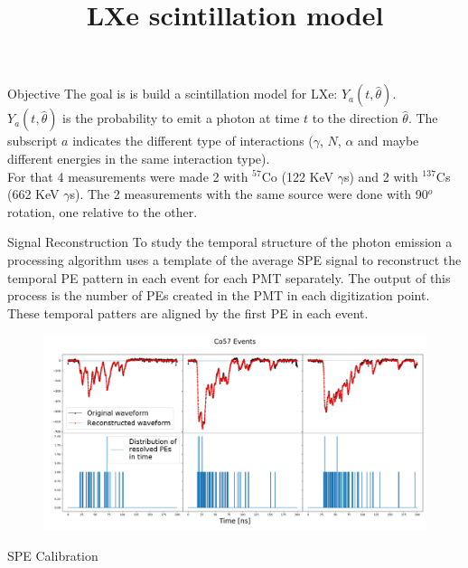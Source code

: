 \documentclass{beamer}
\title{LXe scintillation model}
\begin{document}
{ 
\frame{\titlepage}}

\begin{frame}{Objective}
The goal is is build a scintillation model for LXe: $Y_{a}(t,\hat{\theta})$.\\
$Y_{a}(t,\hat{\theta})$ is the probability to emit a photon at time $t$ to the direction $\hat{\theta}$. The subscript $a$ indicates the different type of interactions ($\gamma$, $N$, $\alpha$ and maybe different energies in the same interaction type).\\

For that 4 measurements were made 2 with $^{57}$Co (122 KeV $\gamma$s) and 2 with $^{137}$Cs (662 KeV $\gamma$s). The 2 measurements with the same source were done with 90$^o$ rotation, one relative to the other.
\end{frame}


\begin{frame}{Signal Reconstruction}
To study the temporal structure of the photon emission a processing algorithm uses a template of the average SPE signal to reconstruct the temporal PE pattern in each event for each PMT separately. The output of this process is the number of PEs created in the PMT in each digitization point. These temporal patters are aligned by the first PE in each event.

\begin{figure}[h]
\includegraphics[width=1\textwidth]{recons.png}
\end{figure}
\end{frame}

\begin{frame}{SPE Calibration}

\end{frame}
\end{document}
